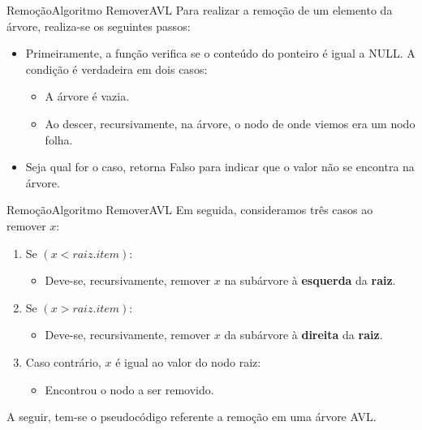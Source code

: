 \documentclass[aspectratio=169]{beamer}
\begin{document}

\begin{frame}{Remoção}{Algoritmo RemoverAVL}
Para realizar a remoção de um elemento da árvore, realiza-se os seguintes passos:
\begin{itemize}
 \item Primeiramente, a função verifica se o conteúdo do ponteiro é igual a NULL. A condição é verdadeira em dois casos:
 \begin{itemize}
 \item A árvore é vazia.
 \item Ao descer, recursivamente, na árvore, o nodo de onde viemos era um nodo folha.
 \end{itemize}
 \item Seja qual for o caso, retorna Falso para indicar que o valor não se encontra na árvore.
\end{itemize}
\end{frame}


\begin{frame}{Remoção}{Algoritmo RemoverAVL}
 Em seguida, consideramos três casos ao remover $x$:
 \begin{enumerate}
 \item Se  $(x < raiz.item)$:
 \begin{itemize}
 \item Deve-se, recursivamente, remover $x$ na subárvore à {\bf esquerda} da {\bf raiz}.
\end{itemize}  
 \item Se $(x > raiz.item)$:
 \begin{itemize}
 \item Deve-se, recursivamente, remover $x$ da subárvore à {\bf direita} da {\bf raiz}. 
\end{itemize}  
 \item Caso contrário, $x$ é igual ao valor do nodo raiz:
 \begin{itemize}
 \item Encontrou o nodo a ser removido.
\end{itemize} 
\end{enumerate}
A seguir, tem-se o pseudocódigo referente a remoção em uma árvore AVL.
\end{frame}

\end{document}
